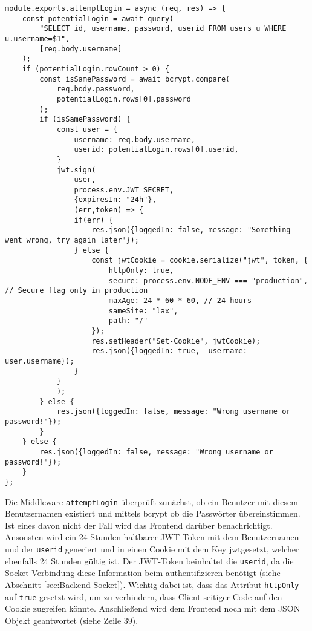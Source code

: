 \begin{lstlisting}[style=codeStyle, caption={Die attemptLogin Middleware zum Anmelden}, label={lst:attemptLogin}]
module.exports.attemptLogin = async (req, res) => {
    const potentialLogin = await query(
        "SELECT id, username, password, userid FROM users u WHERE u.username=$1",
        [req.body.username]
    );
    if (potentialLogin.rowCount > 0) {
        const isSamePassword = await bcrypt.compare(
            req.body.password,
            potentialLogin.rows[0].password
        );
        if (isSamePassword) {
            const user = {
                username: req.body.username,
                userid: potentialLogin.rows[0].userid,
            }
            jwt.sign(
                user,
                process.env.JWT_SECRET,
                {expiresIn: "24h"},
                (err,token) => {
                if(err) {
                    res.json({loggedIn: false, message: "Something went wrong, try again later"});
                } else {
                    const jwtCookie = cookie.serialize("jwt", token, {
                        httpOnly: true,
                        secure: process.env.NODE_ENV === "production", // Secure flag only in production
                        maxAge: 24 * 60 * 60, // 24 hours
                        sameSite: "lax",
                        path: "/"
                    });
                    res.setHeader("Set-Cookie", jwtCookie);
                    res.json({loggedIn: true,  username: user.username});
                }
            }
            );
        } else {
            res.json({loggedIn: false, message: "Wrong username or password!"});
        }
    } else {
        res.json({loggedIn: false, message: "Wrong username or password!"});
    }
};
\end{lstlisting}

Die Middleware \verb|attemptLogin| überprüft zunächst, ob ein Benutzer mit diesem Benutzernamen existiert und mittels bcrypt ob die Passwörter übereinstimmen. Ist eines davon nicht der Fall wird das Frontend darüber benachrichtigt. Ansonsten wird ein 24 Stunden haltbarer JWT-Token mit dem Benutzernamen und der \verb|userid| generiert und in einen Cookie mit dem Key \glqq jwt\grqq{ }gesetzt, welcher ebenfalls 24 Stunden gültig ist. Der JWT-Token beinhaltet die \verb|userid|, da die Socket Verbindung diese Information beim authentifizieren benötigt (siehe Abschnitt \ref{sec:Backend-Socket}).  Wichtig dabei ist, dass das Attribut \verb|httpOnly| auf \verb|true| gesetzt wird, um zu verhindern, dass Client seitiger Code auf den Cookie zugreifen könnte. Anschließend wird dem Frontend noch mit dem JSON Objekt geantwortet (siehe Zeile 39).

